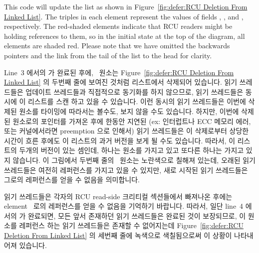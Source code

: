 This code will update the list as shown in
Figure~\ref{fig:defer:RCU Deletion From Linked List}.
The triples in each element represent the values of fields ,
, and , respectively.
The red-shaded elements
indicate that RCU readers might be holding references to them,
so in the initial state at the top of the diagram, all elements
are shaded red.
Please note that
we have omitted the backwards pointers and the link from the tail
of the list to the head for clarity.
\fi

Line~3 에서의  가 완료된 후에, ~원소는
Figure~\ref{fig:defer:RCU Deletion From Linked List} 의 두번째 줄에 보여진
것처럼 리스트에서 삭제되어 있습니다.
읽기 쓰레드들은 업데이트 쓰레드들과 직접적으로 동기화를 하지 않으므로, 읽기
쓰레드들은 동시에 이 리스트를 스캔 하고 있을 수 있습니다.
이런 동시의 읽기 쓰레드들은 이번에 삭제된 원소를 타이밍에 따라서는 볼수도, 보지
않을 수도 있습니다.
하지만, 이번에 삭제된 원소로의 포인터를 가져온 후에 한동안 지연된 (ex:
인터럽트나 ECC 메모리 에러, 또는  커널에서라면 preemption
으로 인해서) 읽기 쓰레드들은 이 삭제로부터 상당한 시간이 흐른 후에도 이
리스트의 과거 버전을 보게 될 수도 있습니다.
따라서, 이 리스트의 두개의 버전이 있는 셈인데, 하나는  원소를 가지고
있고 또다른 하나는 가지고 있지 않습니다.
이 그림에서 두번째 줄의 ~원소는 노란색으로 칠해져 있는데, 오래된 읽기
쓰레드들은 여전히 레퍼런스를 가지고 있을 수 있지만, 새로 시작된 읽기 쓰레드들은
그로의 레퍼런스를 얻을 수 없음을 의미합니다.

읽기 쓰레드들은 각자의 RCU read-side 크리티컬 섹션들에서 빠져나온 후에는
element~ 로의 레퍼런스를 얻을 수 없음을 기억하기 바랍니다.
따라서, 일단 line~4 에서의  가 완료되면, 모든 앞서
존재하던 읽기 쓰레드들은 완료된 것이 보장되므로, 이 원소를 레퍼런스 하는 읽기
쓰레드들은 존재할 수 없어지는데
Figure~\ref{fig:defer:RCU Deletion From Linked List} 의 세번째 줄에 녹색으로
색칠됨으로써 이 상황이 나타내어져 있습니다.

